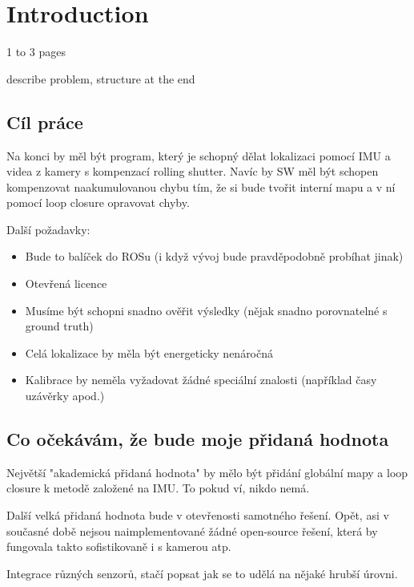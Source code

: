 \chapter*{Introduction}

1 to 3 pages

describe problem, structure at the end


\section{Cíl práce}

Na konci by měl být program, který je schopný dělat lokalizaci pomocí IMU a videa z kamery s kompenzací rolling shutter. Navíc by SW měl být schopen kompenzovat naakumulovanou chybu tím, že si bude tvořit interní mapu a v ní pomocí loop closure opravovat chyby. 

Další požadavky:
\begin{itemize}
\item Bude to balíček do ROSu (i když vývoj bude pravděpodobně probíhat jinak)
\item Otevřená licence
\item Musíme být schopni snadno ověřit výsledky (nějak snadno porovnatelné s ground truth)
\item Celá lokalizace by měla být energeticky nenáročná
\item Kalibrace by neměla vyžadovat žádné speciální znalosti (například časy uzávěrky apod.)
\end{itemize}

\section{Co očekávám, že bude moje přidaná hodnota}

Největší "akademická přidaná hodnota" by mělo být přidání globální mapy a loop closure k metodě založené na IMU. To pokud ví, nikdo nemá.

Další velká přidaná hodnota bude v otevřenosti samotného řešení. Opět, asi v současné době nejsou naimplementované žádné open-source řešení, která by fungovala takto sofistikovaně i s kamerou atp.

Integrace různých senzorů, stačí popsat jak se to udělá na nějaké hrubší úrovni.